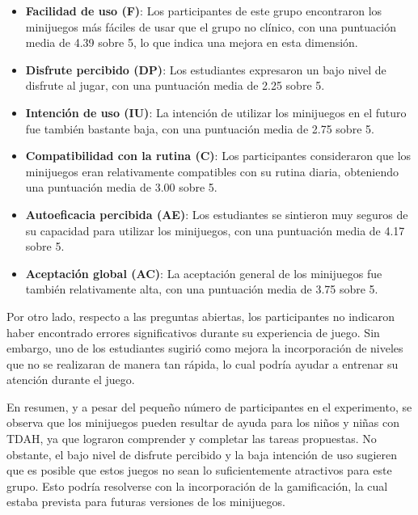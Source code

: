 \begin{itemize}
    \item \textbf{Facilidad de uso (F)}: Los participantes de este grupo encontraron los minijuegos más fáciles de usar que el grupo no clínico, con una puntuación media de 4.39 sobre 5, lo que indica una mejora en esta dimensión.
    \item \textbf{Disfrute percibido (DP)}: Los estudiantes expresaron un bajo nivel de disfrute al jugar, con una puntuación media de 2.25 sobre 5.
    \item \textbf{Intención de uso (IU)}: La intención de utilizar los minijuegos en el futuro fue también bastante baja, con una puntuación media de 2.75 sobre 5.
    \item \textbf{Compatibilidad con la rutina (C)}: Los participantes consideraron que los minijuegos eran relativamente compatibles con su rutina diaria, obteniendo una puntuación media de 3.00 sobre 5.
    \item \textbf{Autoeficacia percibida (AE)}: Los estudiantes se sintieron muy seguros de su capacidad para utilizar los minijuegos, con una puntuación media de 4.17 sobre 5.
    \item \textbf{Aceptación global (AC)}: La aceptación general de los minijuegos fue también relativamente alta, con una puntuación media de 3.75 sobre 5.
\end{itemize}

Por otro lado, respecto a las preguntas abiertas, los participantes no indicaron haber encontrado errores significativos durante su experiencia de juego.
Sin embargo, uno de los estudiantes sugirió como mejora la incorporación de niveles que no se realizaran de manera tan rápida, lo cual podría ayudar a entrenar su atención durante el juego.

En resumen, y a pesar del pequeño número de participantes en el experimento, se observa que los minijuegos pueden resultar de ayuda para los niños y niñas con TDAH, ya que lograron comprender y completar las tareas propuestas.
No obstante, el bajo nivel de disfrute percibido y la baja intención de uso sugieren que es posible que estos juegos no sean lo suficientemente atractivos para este grupo.
Esto podría resolverse con la incorporación de la gamificación, la cual estaba prevista para futuras versiones de los minijuegos.